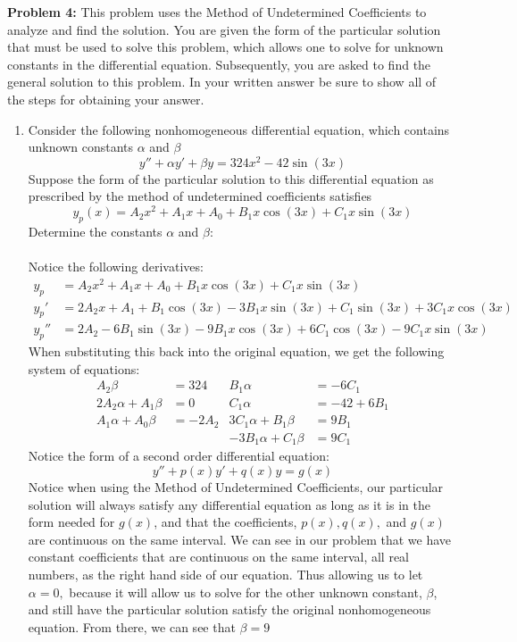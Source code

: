 \documentclass[12pt]{article}
\begin{document}
\noindent \textbf{Problem 4: }This problem uses the Method of Undetermined Coefficients to analyze and find the solution. You are given the form of the particular solution that must be used to solve this problem, which allows one to solve for unknown constants in the differential equation. Subsequently, you are asked to find the general solution to this problem. In your written answer be sure to show all of the steps for obtaining your answer.
\\ 
	\begin{enumerate}[label = (\alph*)]
		\item Consider the following nonhomogeneous differential equation, which contains unknown constants $\alpha$ and $\beta$
			$$
			y'' + \alpha y' + \beta y = 324x^2  -42\sin(3x)
			$$
		Suppose the form of the particular solution to this differential equation as prescribed by the method of undetermined coefficients satisfies
			$$
			y_p(x) = A_2x^2 + A_1x + A_0 + B_1x\cos(3x) + C_1x\sin(3x)
			$$
		Determine the constants $\alpha$ and $\beta$:
		\\ \\
		Notice the following derivatives:
			\begin{align*}
				y_p &= A_2x^2 + A_1x + A_0 + B_1x\cos(3x) + C_1x\sin(3x) \\
				y_p' &= 2A_2x + A_1 + B_1\cos(3x) - 3 B_1x\sin(3x) + C_1\sin(3x) + 3C_1x\cos(3x) \\
				y_p'' &= 2A_2 - 6B_1\sin(3x) -9B_1x\cos(3x) + 6C_1\cos(3x) - 9C_1x\sin(3x)
			\end{align*}
		When substituting this back into the original equation, we get the following system of equations:
			\begin{align*}
				A_2\beta &= 324 & B_1\alpha &= -6C_1 \\
				2A_2\alpha + A_1\beta &= 0 & C_1\alpha &= -42 + 6B_1 \\
				A_1\alpha + A_0\beta &= -2A_2 & 3C_1\alpha + B_1\beta &= 9B_1 \\
				& &	-3B_1\alpha + C_1\beta &= 9C_1
			\end{align*}
		Notice the form of a second order differential equation:	
			$$
			y'' + p(x)y' + q(x)y = g(x)
			$$
		Notice when using the Method of Undetermined Coefficients, our particular solution will always satisfy any differential equation as long as it is in the form needed for $g(x)$, and that the coefficients, $p(x),q(x),$ and $g(x)$ are continuous on the same interval.  We can see in our problem that we have constant coefficients that are continuous on the same interval, all real numbers, as the right hand side of our equation. Thus allowing us to let \boldmath$\alpha = 0,$ \unboldmath because it will allow us to solve for the other unknown constant, $\beta$, and still have the particular solution satisfy the original nonhomogeneous equation. From there, we can see that \boldmath$\beta = 9$ 
		\unboldmath
		

\end{enumerate}
\end{document}
